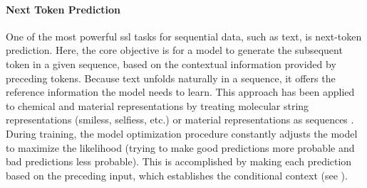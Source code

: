 \paragraph{Next Token Prediction} 
\label{sec:next_token_prediction}
One of the most powerful \gls{ssl} tasks for sequential data, such as text, is next-token prediction.
Here, the core objective is for a model to generate the subsequent token in a given sequence, based on the contextual information provided by preceding tokens. 
Because text unfolds naturally in a sequence, it offers the reference information the model needs to learn. This approach has been applied to chemical and material representations by treating molecular string representations (\glspl{smiles}, \glspl{selfies}, etc.) or material representations as sequences \autocite{adilov2021generative, wang2023cmolgpt, schwaller2019molecular, alampara2024mattext}. 
During training, the model optimization procedure constantly adjusts the model to maximize the likelihood (trying to make good predictions more probable and bad predictions less probable). This is accomplished by making each prediction based on the preceding input, which establishes the conditional context (see ).


